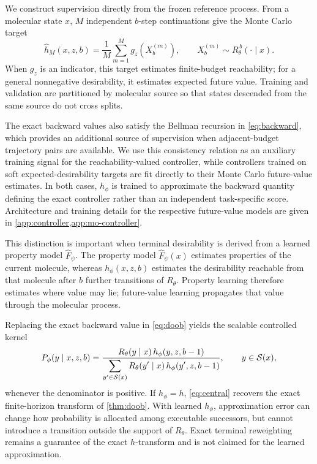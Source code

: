 We construct supervision directly from the frozen reference process. From a molecular state $x$, $M$ independent $b$-step continuations give the Monte Carlo target
\begin{equation}
\widehat h_M(x,z,b)=\frac{1}{M}\sum_{m=1}^{M}g_z\!\left(X_b^{(m)}\right),
\qquad
X_b^{(m)}\sim R_\theta^{\,b}(\cdot\mid x).
\label{eq:mctarget}
\end{equation}
When $g_z$ is an indicator, this target estimates finite-budget reachability; for a general nonnegative desirability, it estimates expected future value. Training and validation are partitioned by molecular source so that states descended from the same source do not cross splits.

The exact backward values also satisfy the Bellman recursion in \cref{eq:backward}, which provides an additional source of supervision when adjacent-budget trajectory pairs are available. We use this consistency relation as an auxiliary training signal for the reachability-valued controller, while controllers trained on soft expected-desirability targets are fit directly to their Monte Carlo future-value estimates. In both cases, $h_\phi$ is trained to approximate the backward quantity defining the exact controller rather than an independent task-specific score. Architecture and training details for the respective future-value models are given in \cref{app:controller,app:mo-controller}.

This distinction is important when terminal desirability is derived from a learned property model $\widehat F_\psi$. The property model $\widehat F_\psi(x)$ estimates properties of the current molecule, whereas $h_\phi(x,z,b)$ estimates the desirability reachable from that molecule after $b$ further transitions of $R_\theta$. Property learning therefore estimates where value may lie; future-value learning propagates that value through the molecular process.

Replacing the exact backward value in \cref{eq:doob} yields the scalable controlled kernel
\begin{equation}
P_\phi(y\mid x,z,b)=\frac{R_\theta(y\mid x)\,h_\phi(y,z,b-1)}{\displaystyle\sum_{y'\in\mathcal{S}(x)}R_\theta(y'\mid x)\,h_\phi(y',z,b-1)},
\qquad y\in\mathcal{S}(x),
\label{eq:central}
\end{equation}
whenever the denominator is positive. If $h_\phi=h$, \cref{eq:central} recovers the exact finite-horizon transform of \cref{thm:doob}. With learned $h_\phi$, approximation error can change how probability is allocated among executable successors, but cannot introduce a transition outside the support of $R_\theta$. Exact terminal reweighting remains a guarantee of the exact $h$-transform and is not claimed for the learned approximation.

